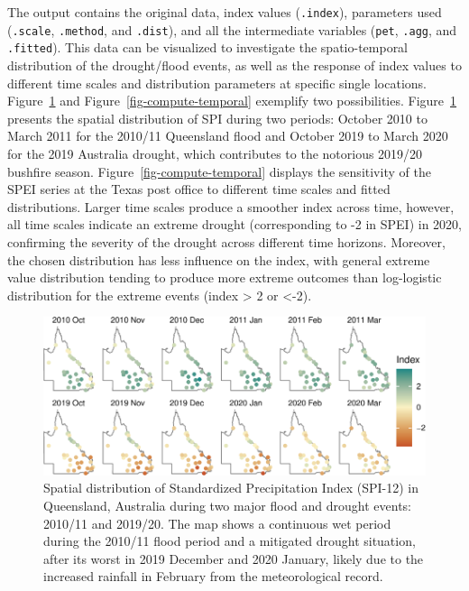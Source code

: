 \documentclass[
]{interact}
\begin{document}
The output contains the original data, index values (\texttt{.index}),
parameters used (\texttt{.scale}, \texttt{.method}, and \texttt{.dist}),
and all the intermediate variables (\texttt{pet}, \texttt{.agg}, and
\texttt{.fitted}). This data can be visualized to investigate the
spatio-temporal distribution of the drought/flood events, as well as the
response of index values to different time scales and distribution
parameters at specific single locations.
Figure~\ref{fig-compute-spatial} and Figure~\ref{fig-compute-temporal}
exemplify two possibilities. Figure~\ref{fig-compute-spatial} presents
the spatial distribution of SPI during two periods: October 2010 to
March 2011 for the 2010/11 Queensland flood and October 2019 to March
2020 for the 2019 Australia drought, which contributes to the notorious
2019/20 bushfire season. Figure~\ref{fig-compute-temporal} displays the
sensitivity of the SPEI series at the Texas post office to different
time scales and fitted distributions. Larger time scales produce a
smoother index across time, however, all time scales indicate an extreme
drought (corresponding to -2 in SPEI) in 2020, confirming the severity
of the drought across different time horizons. Moreover, the chosen
distribution has less influence on the index, with general extreme value
distribution tending to produce more extreme outcomes than log-logistic
distribution for the extreme events (index \textgreater{} 2 or
\textless-2).

\begin{figure}

{\centering \includegraphics{tidyindex_files/figure-pdf/fig-compute-spatial-1.pdf}

}

\caption{\label{fig-compute-spatial}Spatial distribution of Standardized
Precipitation Index (SPI-12) in Queensland, Australia during two major
flood and drought events: 2010/11 and 2019/20. The map shows a
continuous wet period during the 2010/11 flood period and a mitigated
drought situation, after its worst in 2019 December and 2020 January,
likely due to the increased rainfall in February from the meteorological
record.}

\end{figure}
\end{document}

